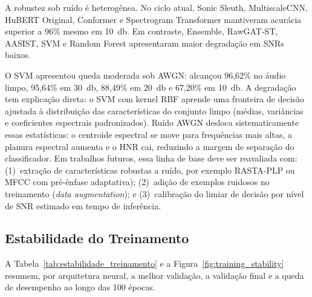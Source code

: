 \documentclass[12pt,a4paper]{article}
\begin{document}
A robustez sob ruído é heterogênea. No ciclo atual, Sonic Sleuth,
MultiscaleCNN, HuBERT Original, Conformer e Spectrogram Transformer mantiveram
acurácia superior a 96\% mesmo em \SI{10}{\decibel}. Em contraste, Ensemble,
RawGAT-ST, AASIST, SVM e Random Forest apresentaram maior degradação em SNRs
baixos.

O SVM apresentou queda moderada sob AWGN: alcançou 96,62\% no áudio limpo,
95,64\% em \SI{30}{\decibel}, 88,49\% em \SI{20}{\decibel} e 67,20\% em
\SI{10}{\decibel}. A degradação tem explicação direta: o SVM com kernel RBF
aprende uma fronteira de decisão ajustada à distribuição das características
do conjunto limpo (médias, variâncias e coeficientes espectrais padronizados).
Ruído AWGN desloca sistematicamente essas estatísticas: o centroide espectral
se move para frequências mais altas, a planura espectral aumenta e o HNR cai,
reduzindo a margem de separação do classificador.
Em trabalhos futuros, essa linha de base deve ser reavaliada com:
(1)~extração de características robustas a ruído, por exemplo RASTA-PLP ou MFCC
com pré-ênfase adaptativa); (2)~adição de exemplos ruidosos no treinamento
(\textit{data augmentation}); e (3)~calibração do limiar de decisão por nível
de SNR estimado em tempo de inferência.

\subsection{Estabilidade do Treinamento}
\label{sec:estabilidade}

A Tabela~\ref{tab:estabilidade_treinamento} e a
Figura~\ref{fig:training_stability} resumem, por arquitetura neural, a melhor
validação, a validação final e a queda de desempenho ao longo das 100 épocas.
\end{document}
